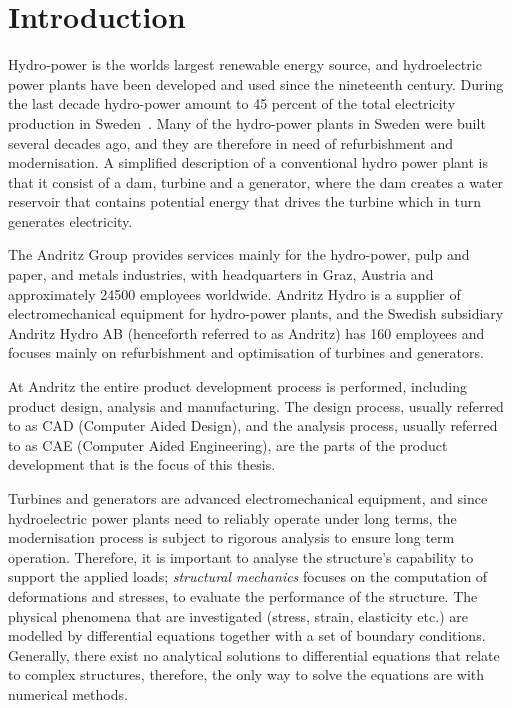 
\chapter{Introduction}
\label{cha:introdution}
Hydro-power is the worlds largest renewable energy source, and hydroelectric power plants have been developed and used since the nineteenth century. During the last decade hydro-power amount to 45 percent of the total electricity production in Sweden~\cite{scb}. Many of the hydro-power plants in Sweden were built several decades ago, and they are therefore in need of refurbishment and modernisation. A simplified description of a conventional hydro power plant is that it consist of a dam, turbine and a generator, where the dam creates a water reservoir that contains potential energy that drives the turbine which in turn generates electricity.

The Andritz Group provides services mainly for the hydro-power, pulp and paper, and metals industries, with headquarters in Graz, Austria and approximately \num{24500} employees worldwide. Andritz Hydro is a supplier of electromechanical equipment for hydro-power plants, and the Swedish subsidiary Andritz Hydro AB (henceforth referred to as Andritz) has 160 employees and focuses mainly on refurbishment and optimisation of turbines and generators.

At Andritz the entire product development process is performed, including product design, analysis and manufacturing. The design process, usually referred to as CAD (Computer Aided Design), and the analysis process, usually referred to as CAE (Computer Aided Engineering), are the parts of the product development that is the focus of this thesis.

Turbines and generators are advanced electromechanical equipment, and since hydroelectric power plants need to reliably operate under long terms, the modernisation process is subject to rigorous analysis to ensure long term operation. Therefore, it is important to analyse the structure's capability to support the applied loads; \textit{structural mechanics} focuses on the computation of deformations and stresses, to evaluate the performance of the structure. The physical phenomena that are investigated (stress, strain, elasticity etc.) are modelled by differential equations together with a set of boundary conditions. Generally, there exist no analytical solutions to differential equations that relate to complex structures, therefore, the only way to solve the equations are with numerical methods.

